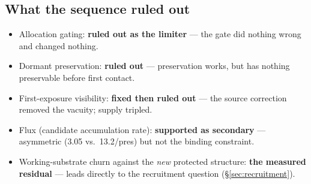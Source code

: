 \subsection{What the sequence ruled out}

\begin{itemize}
\item Allocation gating: \textbf{ruled out as the limiter} --- the gate
did nothing wrong and changed nothing.
\item Dormant preservation: \textbf{ruled out} --- preservation works,
but has nothing preservable before first contact.
\item First-exposure visibility: \textbf{fixed then ruled out} --- the
source correction removed the vacuity; supply tripled.
\item Flux (candidate accumulation rate): \textbf{supported as
secondary} --- asymmetric (3.05 vs.\ 13.2/pres) but not the binding
constraint.
\item Working-substrate churn against the \emph{new} protected
structure: \textbf{the measured residual} --- leads directly to the
recruitment question (\S\ref{sec:recruitment}).
\end{itemize}